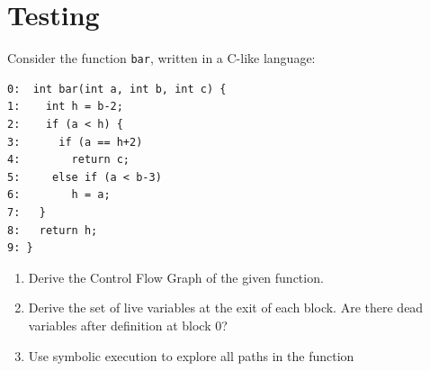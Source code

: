 \section{Testing}

Consider the function \texttt{bar}, written in a C-like language:
\begin{lstlisting}[style=C]
0:  int bar(int a, int b, int c) {
1:    int h = b-2;
2:    if (a < h) {
3:      if (a == h+2)
4:        return c;
5:     else if (a < b-3)
6:        h = a;
7:   }
8:   return h; 
9: } 
\end{lstlisting}
\begin{enumerate}
    \item Derive the Control Flow Graph of the given function.
    \item Derive the set of live variables at the exit of each block.
        Are there dead variables after definition at block 0?
    \item Use symbolic execution to explore all paths in the function
\end{enumerate}

